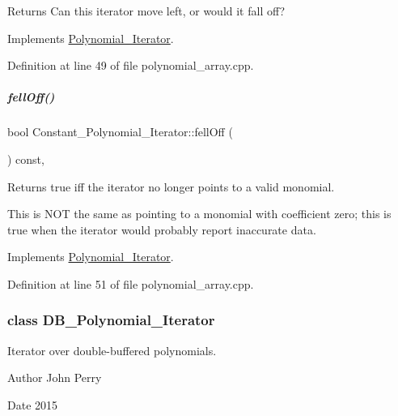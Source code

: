 \begin{DoxyReturn}{Returns}
Can this iterator move left, or would it fall off? 
\end{DoxyReturn}


Implements \hyperlink{group___iterator_group_a7ab348897446bc182500f84df8a9e590}{Polynomial\+\_\+\+Iterator}.



Definition at line 49 of file polynomial\+\_\+array.\+cpp.

\mbox{\label{group___iterator_group_a1b87a857220a97fe403c5164a51f86eb}} 
\subparagraph{\texorpdfstring{fell\+Off()}{fellOff()}}
{\footnotesize\ttfamily bool Constant\+\_\+\+Polynomial\+\_\+\+Iterator\+::fell\+Off (\begin{DoxyParamCaption}{ }\end{DoxyParamCaption}) const\hspace{0.3cm}{\ttfamily [override]}, {\ttfamily [virtual]}}

\begin{DoxyReturn}{Returns}
true iff the iterator no longer points to a valid monomial.
\end{DoxyReturn}
This is N\+OT the same as pointing to a monomial with coefficient zero; this is true when the iterator would probably report inaccurate data. 

Implements \hyperlink{group___iterator_group_ac571e120134088d6067718bbad513e2d}{Polynomial\+\_\+\+Iterator}.



Definition at line 51 of file polynomial\+\_\+array.\+cpp.

\label{class_d_b___polynomial___iterator}
\subsubsection{class D\+B\+\_\+\+Polynomial\+\_\+\+Iterator}
Iterator over double-\/buffered polynomials. 

\begin{DoxyAuthor}{Author}
John Perry 
\end{DoxyAuthor}
\begin{DoxyDate}{Date}
2015 
\end{DoxyDate}


